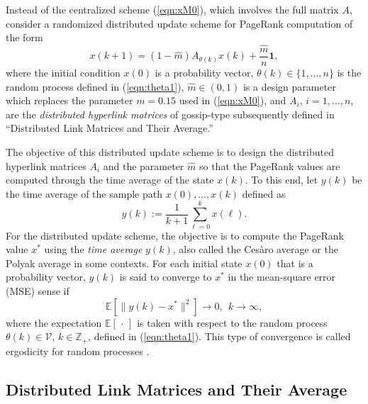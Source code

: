 \documentclass[11pt,draftcls,onecolumn]{IEEEtran}
\newcommand{\field}[1]{{\mathbb{#1}}}
\newcommand{\one}{\mathbf{1}}
\newcommand{\Z}{\field{Z}}
\newcommand{\E}{\field{E}}
\begin{document}

Instead of the centralized scheme (\ref{eqn:xM0}), which involves the full matrix $A$, 
consider a randomized distributed update scheme for PageRank computation of the form
\begin{equation}
  x(k+1) 
    = (1-\hat{m}) A_{\theta(k)} x(k) 
        + \frac{\hat{m}}{n}\one,
  \label{eqn:xMi1}
\end{equation}
where the initial condition $x(0)$ is a probability vector, $\theta(k)\in\{1,\ldots,n\}$ is 
the random process defined in (\ref{eqn:theta1}), $\hat{m}\in(0,1)$ is a design parameter 
which replaces the parameter $m=0.15$ used in (\ref{eqn:xM0}), and 
$A_i$, $i=1,\ldots,n$, are the {\it distributed hyperlink matrices} of gossip-type subsequently 
defined in ``Distributed Link Matrices and Their Average.''




The objective of this distributed update scheme 
is to design the distributed hyperlink matrices $A_i$ and the parameter $\hat{m}$
so that the PageRank values are computed
through the time average of the state $x(k)$. To this end, let $y(k)$ be the time average of 
the sample path $x(0),\ldots,x(k)$ defined as
\begin{equation}
y(k) 
:= \frac{1}{k+1}\sum_{\ell=0}^{k} x(\ell).
\label{eqn:yk}
\end{equation}
For the distributed update scheme, the objective is to compute the PageRank value $x^*$ using 
the {\it time average} $y(k)$, also called the Ces\`aro average or the Polyak average in some contexts.
For each initial state $x(0)$ that is a probability vector, 
$y(k)$ is said to converge to $x^*$ in the mean-square error (MSE) sense if
\begin{equation*}
\E\left[
   \bigl\|
      y(k) - x^*
   \bigr\|^2
  \right] \rightarrow 0,~~k\rightarrow\infty,
 \label{eqn:thm:erg}
\end{equation*}
where the expectation $\E[\,\cdot\,]$ is taken with respect to the random process
$\theta(k)\in\mathcal{V}$, $k\in\Z_+$, defined in (\ref{eqn:theta1}).
This type of convergence is called ergodicity for random processes \cite{PapPil:02}.

\subsection*{Distributed Link Matrices and Their Average}
\end{document}
